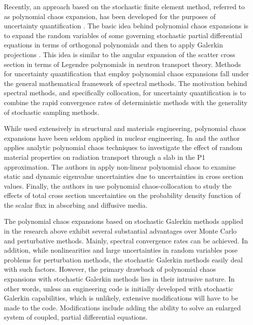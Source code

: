 Recently, an approach based on the stochastic finite element method, referred to as polynomial chaos expansion, has been developed for the purposes of uncertainty quantification \cite{Ghanem_Spanos}. The basic idea behind polynomial chaos expansions is to expand the random variables of some governing stochastic partial differential equations in terms of orthogonal polynomials and then to apply Galerkin projections \cite{LeMaitreKnio}. This idea is similar to the angular expansion of the scatter cross section in terms of Legendre polynomials in neutron transport theory. Methods for uncertainty quantification that employ polynomial chaos expansions fall under the general mathematical framework of spectral methods. The motivation behind spectral methods, and specifically collocation, for uncertainty quantification is to combine the rapid convergence rates of deterministic methods with the generality of stochastic sampling methods. 

While used extensively in structural and materials engineering, polynomial chaos expansions have been seldom applied in nuclear engineering. In \cite{MMR_Williams1} and \cite{MMR_Williams2} the author applies analytic polynomial chaos techniques to investigate the effect of random material properties on radiation transport through a slab in the P1 approximation. The authors in \cite{Ayres_Williams_Eaton} apply non-linear polynomial chaos to examine static and dynamic eigenvalue uncertainties due to uncertainties in cross section values. Finally, the authors in \cite{Fichtl_Prinja} use polynomial chaos-collocation to study the effects of total cross section uncertainties on the probability density function of the scalar flux in absorbing and diffusive media.    

The polynomial chaos expansions based on stochastic Galerkin methods applied in the research above exhibit several substantial advantages over Monte Carlo and perturbative methods. Mainly, spectral convergence rates can be achieved. In addition, while nonlinearities and large uncertainties in random variables pose problems for perturbation methods, the stochastic Galerkin methods easily deal with such factors. However, the primary drawback of polynomial chaos expansions with stochastic Galerkin methods lies in their intrusive nature. In other words, unless an engineering code is initially developed with stochastic Galerkin capabilities, which is unlikely, extensive modifications will have to be made to the code. Modifications include adding the ability to solve an enlarged system of coupled, partial differential equations.      

